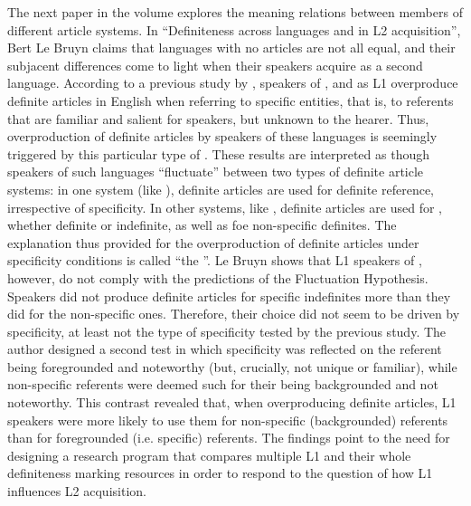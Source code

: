 \documentclass[output=paper]{langsci/langscibook}
\begin{document}
The next paper in the volume explores the meaning relations between members of different article systems. In “Definiteness across languages and in L2 acquisition”, Bert Le Bruyn claims that languages with no articles are not all equal, and their subjacent differences come to light when their speakers acquire  as a second language. According to a previous study by \citet{IoninKoWexler2004}, speakers of ,  and  as L1 overproduce definite articles in English when referring to specific entities, that is, to referents that are familiar and salient for speakers, but unknown to the hearer. Thus, overproduction of definite articles by speakers of these languages is seemingly triggered by this particular type of . These results are interpreted as though speakers of such languages ``fluctuate'' between two types of definite article systems: in one system (like ), definite articles are used for definite reference, irrespective of specificity. In other systems, like , definite articles are used for , whether definite or indefinite, as well as foe non-specific definites. The explanation thus provided for the overproduction of definite articles under specificity conditions is called “the ”. Le Bruyn shows that L1 speakers of , however, do not comply with the predictions of the Fluctuation Hypothesis. Speakers did not produce definite articles for specific indefinites more than they did for the non-specific ones. Therefore, their choice did not seem to be driven by specificity, at least not the type of specificity tested by the previous study. The author designed a second test in which specificity was reflected on the referent being foregrounded and noteworthy (but, crucially, not unique or familiar), while non-specific referents were deemed such for their being backgrounded and not noteworthy. This contrast revealed that, when overproducing definite articles,  L1 speakers were more likely to use them for non-specific (backgrounded) referents than for foregrounded (i.e. specific) referents. The findings point to the need for designing a research program that compares multiple L1 and their whole definiteness marking resources in order to respond to the question of how L1 influences L2 acquisition. 
 
\end{document}
